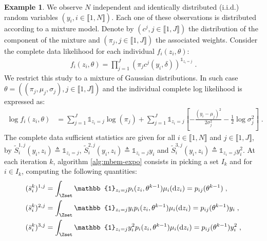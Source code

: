\documentclass[11pt]{article}
\theoremstyle{plain}
\def\eqs{\;}
\newcommand{\indic}{\mathbb{1}}
\newcommand{\inter}{\llbracket1,N\rrbracket}
\theoremstyle{plain}
\theoremstyle{definition}
\newtheorem{exmp}{Example} %
\newcommand{\dz}{\mathrm{d}z}
\begin{document}
\clearpage 
\begin{exmp}
We observe $N$ independent and identically distributed (i.i.d.) random variables $ (y_i, i \in \inter)$. Each one of these observations is distributed according to a mixture model. Denote by $(c^j, j \in \llbracket 1, J \rrbracket)$ the distribution of the component of the mixture and $(\pi_j, j \in \llbracket 1, J \rrbracket)$ the associated weights. Consider the complete data likelihood for each individual $f_i( z_i, \theta)$:
\begin{align} \label{eq1}
f_i( z_i, \theta) = \prod_{j=1}^{J}{(\pi_j c^j(y_i,\delta))^{\indic_{z_i=j}}}\eqs.
\end{align}
We restrict this study to a mixture of Gaussian distributions. In such case $\theta = ((\pi_j, \mu_j, \sigma_j), j \in \llbracket 1, J \rrbracket)$ and the individual complete log likelihood is expressed as:
\begin{align}
\log f_i( z_i, \theta) & = \sum_{j=1}^{J}{\indic_{z_i=j}\log(\pi_j)} + \sum_{j=1}^{J}{\indic_{z_i=j}\left[-\frac{(y_i - \mu_j)^2}{2\sigma^2_j} - \frac{1}{2}\log \sigma^2_j\right]}\eqs.
\end{align}
The complete data sufficient statistics are given for all $i \in \inter$ and $j \in \llbracket1,J\rrbracket$, by $\tilde{S}_i^{1,j}(y_i,z_i) \triangleq \mathbb{1}_{z_i=j}$, $\tilde{S}_i^{2,j}(y_i,z_i) \triangleq \indic_{z_i=j}y_i$ and $\tilde{S}_i^{3,j}(y_i,z_i) \triangleq \indic_{z_i=j}y_i^2$.
At each iteration $k$, algorithm \ref{alg:mbem-expo} consists in picking a set $I_k$ and for $i \in I_k$, computing the following quantities:
\begin{align}
& (\bar{s}_i^k)^{1,j} = \int_{\Zset}{\indic_{z_i=j}p_i(z_i,\theta^{k-1}) \mu_i(\dz_i)} = p_{ij}(\theta^{k-1})\eqs,\\
& (\bar{s}_i^k)^{2,j} = \int_{\Zset}{\indic_{z_i=j}y_ip_i(z_i,\theta^{k-1}) \mu_i(\dz_i)} = p_{ij}(\theta^{k-1})y_i\eqs,\\
& (\bar{s}_i^k)^{3,j} = \int_{\Zset}{\indic_{z_i=j}y_i^2p_i(z_i,\theta^{k-1}) \mu_i(\dz_i)} = p_{ij}(\theta^{k-1})y_i^2\eqs,
\end{align}

\end{exmp}
\end{document}

